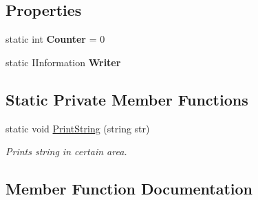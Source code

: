 \subsection*{Properties}
\begin{DoxyCompactItemize}
\item 
\mbox{\label{class_home_work_1_1_task_library_1_1_tasks_1_1_lesson6_1_1_task2_1_1_classes_1_1_u_i_part_ac77eca2e53c566955abffe6dd8b1a1e2}} 
static int {\bfseries Counter} = 0
\item 
\mbox{\label{class_home_work_1_1_task_library_1_1_tasks_1_1_lesson6_1_1_task2_1_1_classes_1_1_u_i_part_a9f7603312cb5c5f1b7b012a0639ea650}} 
static I\+Information {\bfseries Writer}
\end{DoxyCompactItemize}
\subsection*{Static Private Member Functions}
\begin{DoxyCompactItemize}
\item 
static void \mbox{\hyperlink{class_home_work_1_1_task_library_1_1_tasks_1_1_lesson6_1_1_task2_1_1_classes_1_1_u_i_part_a6eda37c969281ba05d1ce502be9a3544}{Print\+String}} (string str)
\begin{DoxyCompactList}\small\item\em Prints string in certain area. \end{DoxyCompactList}\end{DoxyCompactItemize}


\subsection{Member Function Documentation}
\mbox{\label{class_home_work_1_1_task_library_1_1_tasks_1_1_lesson6_1_1_task2_1_1_classes_1_1_u_i_part_a900dde3ec60e346b43af517d61927fba}} 
